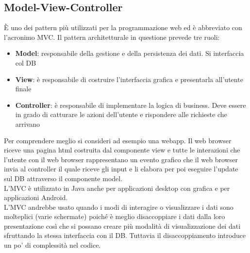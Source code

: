 \subsection{Model-View-Controller}
È uno dei pattern più utilizzati per la programmazione web ed è abbreviato con l'acronimo MVC.
Il pattern architetturale in questione prevede tre ruoli:
\begin{itemize}[noitemsep]
    \item \textbf{Model}: responsabile della gestione e della persistenza dei dati. Si interfaccia col \acrfull{DB}
    \item \textbf{View}: è responsabile di costruire l'interfaccia grafica e presentarla all'utente finale
    \item \textbf{Controller}: è responsabile di implementare la logica di business. Deve essere in grado di catturare le azioni dell'utente e rispondere alle richieste che arrivano
\end{itemize}
Per comprendere meglio si consideri ad esempio una webapp.
Il web browser riceve una pagina html costruita dal componente view e tutte le interazioni che l'utente con il web browser rappresentano un evento grafico che il web browser invia al controller il quale riceve gli input e li elabora per poi eseguire l'update sul \acrshort{DB} attraverso il componente model.\\
L'MVC è utilizzato in Java anche per applicazioni desktop con grafica e per applicazioni Android.\\
L'MVC andrebbe usato quando i modi di interagire o visualizzare i dati sono molteplici (varie schermate) poiché è meglio disaccoppiare i dati dalla loro presentazione così che si possano creare più modalità di visualizzazione dei dati sfruttando la stessa interfaccia con il \acrshort{DB}.
Tuttavia il disaccoppiamento introduce un po' di complessità nel codice.

